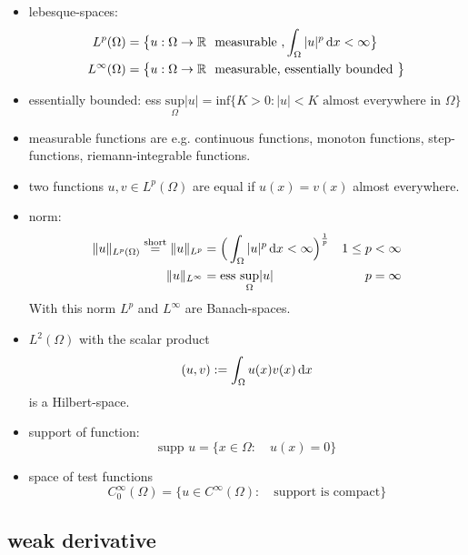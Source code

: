 \begin{itemize}
	\item lebesque-spaces: 
		\begin{align*}
			L^p(\Omega) &= \big\{ u: \Omega \to \mathbb{R} \ \text{ measurable } , \int_\Omega |u|^p \mathop{}\!\mathrm{d} x < \infty \big\}  \\
			L^\infty(\Omega) &= \big\{ u: \Omega \to \mathbb{R} \ \text{ measurable, essentially bounded } \big\}
		\end{align*}
	\item essentially bounded: ess $ \underset{\Omega}{\text{sup}} |u| = \text{inf}\big\{ K >0 : |u|<K \text{ almost everywhere in } \Omega \big\}  $
	
	\item measurable functions are e.g. continuous functions, monoton functions, step-functions, riemann-integrable functions.
	\item two functions $u,v \in L^p(\Omega)$ are equal if $u(x) = v(x)$ almost everywhere.
	\item norm: 
		\begin{align*}
			\|u\|_{L^p(\Omega)} \overset{\text{short}}{=}\|u\|_{L^p} &= \Big ( \int_\Omega |u|^p \mathop{}\!\mathrm{d} x < \infty \Big )^{\frac{1}{p} } & 1 \leq p&<\infty \\
			\|u\|_{L^\infty} &= \text{ess }\underset{\Omega}{\text{sup}} |u| & p&= \infty 
		\end{align*}
		With this norm $L^p$ and $L^\infty$ are Banach-spaces.
	\item $L^2(\Omega)$ with the scalar product
		\begin{equation*}
			(u,v) := \int_\Omega u(x)v(x) \mathop{}\!\mathrm{d} x 
		\end{equation*}
		is a Hilbert-space.
	\item support of function:
	\begin{equation*}
		\text{supp }u  = \big \{ x \in \Omega:\quad u(x)=0  \big \} 
	\end{equation*}
	\item space of test functions
	\begin{equation*}
		C^\infty_0(\Omega) = \big \{ u \in C^\infty(\Omega):\quad \text{support is compact}  \big\}
	\end{equation*}
\end{itemize}

\subsection{weak derivative}

